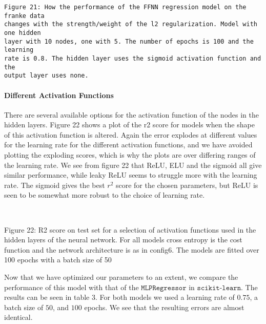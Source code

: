 \documentclass[11pt]{article}
\begin{document}
    \begin{Verbatim}[commandchars=\\\{\}]
Figure 21: How the performance of the FFNN regression model on the franke data
changes with the strength/weight of the l2 regularization. Model with one hidden 
layer with 10 nodes, one with 5. The number of epochs is 100 and the learning 
rate is 0.8. The hidden layer uses the sigmoid activation function and the
output layer uses none.
    \end{Verbatim}

    \hypertarget{different-activation-functions}{%
\paragraph{Different Activation
Functions}\label{different-activation-functions}}

There are several available options for the activation function of the
nodes in the hidden layers. Figure 22 shows a plot of the r2 score for
models when the shape of this activation function is altered. Again the
error explodes at different values for the learning rate for the
different activation functions, and we have avoided plotting the
exploding scores, which is why the plots are over differing ranges of
the learning rate. We see from figure 22 that ReLU, ELU and the sigmoid
all give similar performance, while leaky ReLU seems to struggle more
with the learning rate. The sigmoid gives the best \(r^2\) score for the
chosen parameters, but ReLU is seen to be somewhat more robust to the
choice of learning rate.

    \begin{center}
    \end{center}
    { \hspace*{\fill} \\}
    
    Figure 22: R2 score on test set for a selection of activation functions
used in the hidden layers of the neural network. For all models cross
entropy is the cost function and the network architecture is as in
config6. The models are fitted over 100 epochs with a batch size of 50

    Now that we have optimized our parameters to an extent, we compare the
performance of this model with that of the \(\texttt{MLPRegressor}\) in
\(\texttt{scikit-learn}\). The results can be seen in table 3. For both
models we used a learning rate of \(0.75\), a batch size of \(50\), and
\(100\) epochs. We see that the resulting errors are almost identical.
\end{document}
